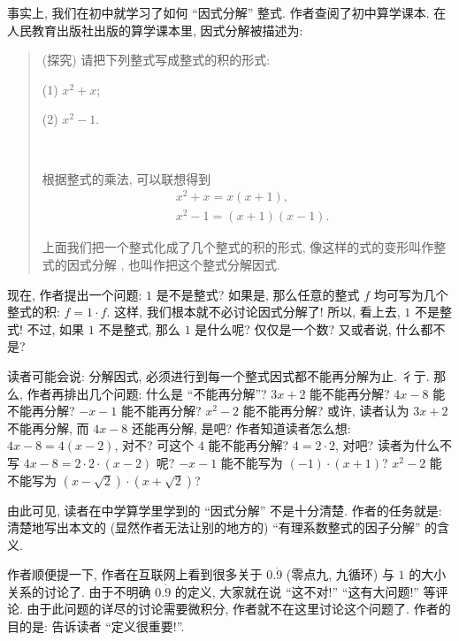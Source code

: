 \begin{example}
    事实上, 我们在初中就学习了如何 ``因式分解'' 整式. 作者查阅了初中算学课本. 在人民教育出版社出版的算学课本里, 因式分解被描述为:
    \begin{quotation}
        (探究) 请把下列整式写成整式的积的形式:

        (1) $x^2 + x$;

        (2) $x^2 - 1$.

        ~\

        根据整式的乘法, 可以联想得到
        \begin{align*}
             & x^2 + x = x(x+1),         \\
             & x^2 - 1 = (x + 1)(x - 1).
        \end{align*}

        上面我们把一个整式化成了几个整式的积的形式, 像这样的式的变形叫作整式的因式分解 , 也叫作把这个整式分解因式.
    \end{quotation}

    现在, 作者提出一个问题: $1$ 是不是整式? 如果是, 那么任意的整式 $f$ 均可写为几个整式的积: $f = 1 \cdot f$. 这样, 我们根本就不必讨论因式分解了! 所以, 看上去, $1$ 不是整式! 不过, 如果 $1$ 不是整式, 那么 $1$ 是什么呢? 仅仅是一个数? 又或者说, 什么都不是?

    读者可能会说: 分解因式, 必须进行到每一个整式因式都不能再分解为止. 彳亍. 那么, 作者再排出几个问题: 什么是 ``不能再分解''? $3x + 2$ 能不能再分解? $4x - 8$ 能不能再分解? $-x - 1$ 能不能再分解? $x^2 - 2$ 能不能再分解? 或许, 读者认为 $3x + 2$ 不能再分解, 而 $4x - 8$ 还能再分解, 是吧? 作者知道读者怎么想: $4x - 8 = 4(x - 2)$, 对不? 可这个 $4$ 能不能再分解? $4 = 2 \cdot 2$, 对吧? 读者为什么不写 $4x - 8 = 2 \cdot 2 \cdot (x-2)$ 呢? $-x - 1$ 能不能写为 $(-1) \cdot (x+1)$? $x^2 - 2$ 能不能写为 $(x - \sqrt{2}) \cdot (x + \sqrt{2})$?

    由此可见, 读者在中学算学里学到的 ``因式分解'' 不是十分清楚. 作者的任务就是: 清楚地写出本文的 (显然作者无法让别的地方的) ``有理系数整式的因子分解'' 的含义.

    作者顺便提一下, 作者在互联网上看到很多关于 $0.\dot{9}$ (零点九, 九循环) 与 $1$ 的大小关系的讨论了. 由于不明确 $0.\dot{9}$ 的定义, 大家就在说 ``这不对!'' ``这有大问题!'' 等评论. 由于此问题的详尽的讨论需要微积分, 作者就不在这里讨论这个问题了. 作者的目的是: 告诉读者 ``定义很重要!''.
\end{example}

